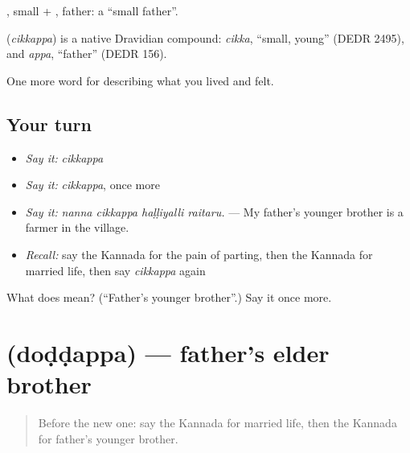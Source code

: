 , small + , father: a \textquotedblleft{}small father\textquotedblright{}.

\begin{cousinweb}
\textbf{} (\emph{cikkappa}) is a native Dravidian compound: \emph{cikka}, \textquotedblleft{}small, young\textquotedblright{} (DEDR 2495), and \emph{appa}, \textquotedblleft{}father\textquotedblright{} (DEDR 156).
\end{cousinweb}

\begin{grammarlens}[title={What you've built}]
One more word for describing what you lived and felt.
\end{grammarlens}

\subsection*{Your turn}
\begin{itemize}
\raggedright
  \item \emph{Say it:} \emph{cikkappa}
  \item \emph{Say it:} \emph{cikkappa}, once more
  \item \emph{Say it:} \emph{nanna cikkappa haḷḷiyalli raitaru.} — My father's younger brother is a farmer in the village.
  \item \emph{Recall:} say the Kannada for the pain of parting, then the Kannada for married life, then say \emph{cikkappa} again
\end{itemize}

\begin{tcolorbox}[breakable,colback=teal!4,colframe=teal!35!black,title={Before you move on}]
What does  mean? (\textquotedblleft{}Father's younger brother\textquotedblright{}.) Say it once more.
\end{tcolorbox}
\section[\texorpdfstring{\kn{ದೊಡ್ಡಪ್ಪ} (doḍḍappa)}{ದೊಡ್ಡಪ್ಪ (doḍḍappa)}]{ (doḍḍappa) — father's elder brother}

\label{lesson:KA-C524-doddappa}



\begin{quote}
Before the new one: say the Kannada for married life, then the Kannada for father's younger brother.
\end{quote}

